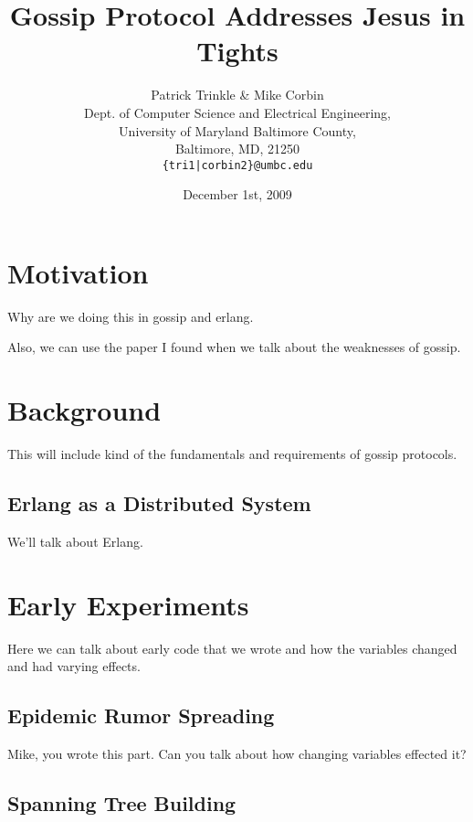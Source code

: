 \documentclass[11pt,twocolumn]{article}
\title{Gossip Protocol Addresses Jesus in Tights}
\author{Patrick Trinkle \& Mike Corbin\\
Dept. of Computer Science and Electrical Engineering,\\
University of Maryland Baltimore County,\\
Baltimore, MD, 21250\\
\texttt{\{tri1|corbin2\}@umbc.edu}}
\date{December 1st, 2009}
\begin{document}

\section{Motivation}

Why are we doing this in gossip and erlang.

Also, we can use the paper I found when we talk about the weaknesses of gossip.

\section{Background}

This will include kind of the fundamentals and requirements of gossip protocols.

\subsection{Erlang as a Distributed System}

We'll talk about Erlang.

\section{Early Experiments}

Here we can talk about early code that we wrote and how the variables changed 
and had varying effects.

\subsection{Epidemic Rumor Spreading}

Mike, you wrote this part.  Can you talk about how changing variables effected
it?

\subsection{Spanning Tree Building}
\end{document}
